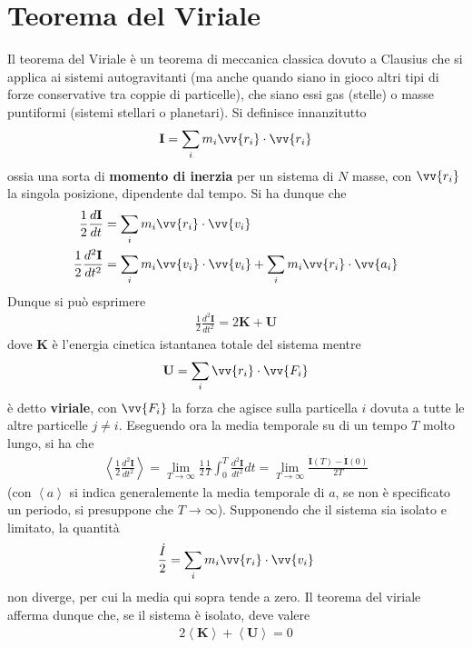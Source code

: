 \documentclass[a4paper, oneside]{book}
\begin{document}
\section{Teorema del Viriale}
Il teorema del Viriale è un teorema di meccanica classica dovuto a Clausius che si applica 
ai sistemi autogravitanti (ma anche quando siano in gioco altri tipi di forze
conservative tra coppie di particelle), che siano essi gas 
(stelle) o masse puntiformi (sistemi stellari o planetari). 
Si definisce innanzitutto 
\begin{align}
    \mathbf{I} = \sum_i m_i \vv{r_i} \cdot \vv{r_i}  
\end{align}
ossia una sorta di \textbf{momento di inerzia} per un sistema di $N$ masse, 
con $\vv{r_i}$ la singola posizione, dipendente dal tempo. Si ha dunque che 
\begin{align*}
    \frac{1}{2}\frac{d\mathbf{I}}{dt} &= \sum_i m_i \vv{r_i} \cdot \vv{v_i} \\
    \frac{1}{2}\frac{d^{2}\mathbf{I}}{dt^{2}} &= \sum_i m_i \vv{v_i} \cdot \vv{v_i} + \sum_i m_i \vv{r_i} \cdot \vv{a_i}    
\end{align*} 
Dunque si può esprimere
\begin{align}
    \frac{1}{2}\frac{d^{2}\mathbf{I}}{dt^{2}} = 2\mathbf{K} + \mathbf{U}
\end{align}
dove $\mathbf{K}$ è l'energia cinetica istantanea totale del sistema mentre
\begin{gather*}
    \mathbf{U} = \sum_i \vv{r_i} \cdot \vv{F_i}  
\end{gather*}
è detto \textbf{viriale}, con $\vv{F_i}$ la forza che agisce sulla particella $i$ dovuta 
a tutte le altre particelle $j \neq i$. Eseguendo ora la media temporale su di un tempo $T$
molto lungo, si ha che
\begin{gather*}
    \left< \frac{1}{2} \frac{d^{2}\mathbf{I}}{dt^{2}} \right> = \lim_{T \to \infty } \frac{1}{2}\frac{1}{T} \int_{0}^{T} \frac{d^{2}\mathbf{I}}{dt^{2}} dt = \lim_{T \to \infty } \frac{\dot{\mathbf{I}}(T) - \dot{\mathbf{I}}(0)  }{2T}    
\end{gather*} 
(con $\left< a \right>$ si indica generalemente la media temporale di $a$, se non è 
specificato un periodo, si presuppone che $T \to \infty$). Supponendo che il sistema 
sia isolato e limitato, la quantità 
\begin{gather*}
    \frac{\dot{I} }{2} = \sum_i m_i \vv{r_i} \cdot \vv{v_i}  
\end{gather*}
non diverge, per cui la media qui sopra tende a zero. Il teorema 
del viriale afferma dunque che, se il sistema è isolato, deve valere 
\begin{align}
    2\left< \mathbf{K} \right> +  \left< \mathbf{U} \right>  = 0
\end{align}
\end{document}
